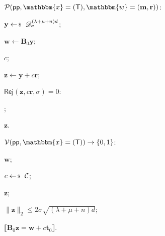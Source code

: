 \documentclass[../../book.tex]{subfiles}
\begin{document}
\begin{algoproto}[ht]
    \small
    \centering
    \begin{mdframed}[linecolor=black, linewidth=1pt,
                     skipabove=10pt, skipbelow=10pt,
                     innerleftmargin=5pt, innerrightmargin=5pt]
        \begin{minipage}[t]{0.46\linewidth}
            \colorbox{oc-blue-1}{$\mathcal{P}(\mathsf{pp}, \mathbbm{x}=(\mathsf{T}), \mathbbm{w}=(\mathbf{m}, \mathbf{r}))$:}
            \begin{algoen}
                \item $\mathbf{y} \leftarrowS \dgaussian_{\sigma}^{(\lambda+\mu+n)d}$;
                \item {} $\mathbf{w} \gets \mathbf{B}_0\mathbf{y}$;
                \item {} $c$;
                \item $\mathbf{z} \gets \mathbf{y} + c\mathbf{r}$;
                \item {} $\mathsf{Rej}(\mathbf{z}, c\mathbf{r}, \sigma) = 0$: 
                \item \hspace{5px} ;
                \item {} $\mathbf{z}$.
            \end{algoen}
        \end{minipage}
        \hfill
        \begin{minipage}[t]{0.5\linewidth}
            \colorbox{oc-blue-1}{$\mathcal{V}(\mathsf{pp}, \mathbbm{x}=(\mathsf{T})) \to \{0,1\}$:}
            \begin{algoen}
                \item {} $\mathbf{w}$;
                \item {} $c \leftarrowS \mathcal{C}$;
                \item {} $\mathbf{z}$;
                \item {} $\|\mathbf{z}\|_2 \leq 2\sigma\sqrt{(\lambda+\mu+n)d}$;
                \item {} $\llbracket \mathbf{B}_0\mathbf{z} = \mathbf{w} + c\mathbf{t}_0 \rrbracket$.
            \end{algoen}
        \end{minipage}
    \end{mdframed}
    \caption{Opening proof for the BDLOP commitment. Here, $\dgaussian_{\sigma}^{(\lambda+\mu+n)d}$ denotes the discrete Gaussian over the coefficient vectors of $\mathcal{R}^{\lambda+\mu+n}$.}
    \label{fig:bdlop-opening}
\end{algoproto}
\end{document}
